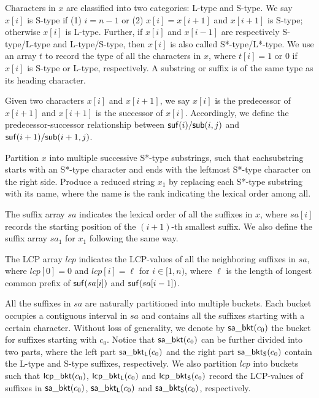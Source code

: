 \documentclass[10pt,journal,compsoc]{IEEEtran}
\begin{document}
Characters in $x$ are classified into two categories: L-type and S-type. We say $x[i]$ is S-type if (1) $i = n - 1$ or (2) $x[i] = x[i + 1]$ and $x[i + 1]$ is S-type; otherwise $x[i]$ is L-type. Further, if $x[i]$ and $x[i - 1]$ are respectively S-type/L-type and L-type/S-type, then $x[i]$ is also called S*-type/L*-type. We use an array $t$ to record the type of all the characters in $x$, where $t[i] = 1$ or $0$ if $x[i]$ is S-type or L-type, respectively. A substring or suffix is of the same type as its heading character.

Given two characters $x[i]$ and $x[i + 1]$, we say $x[i]$ is the predecessor of $x[i + 1]$ and $x[i + 1]$ is the successor of $x[i]$. Accordingly, we define the predecessor-successor relationship between ${\sf suf}(i)/{\sf sub}(i, j)$ and ${\sf suf}(i + 1)/{\sf sub}(i + 1, j)$.

Partition $x$ into multiple successive S*-type substrings, such that eachsubstring starts with an S*-type character and ends with the leftmost S*-type character on the right side. Produce a reduced string $x_1$ by replacing each S*-type substring with its name, where the name is the rank indicating the lexical order among all.

The suffix array $sa$ indicates the lexical order of all the suffixes in $x$, where $sa[i]$ records the starting position of the $(i + 1)$-th smallest suffix. We also define the suffix array $sa_1$ for $x_1$ following the same way.

The LCP array $lcp$ indicates the LCP-values of all the neighboring suffixes in $sa$, where $lcp[0] = 0$ and $lcp[i] = \ell$ for $i \in [1, n)$, where $\ell$ is the length of longest common prefix of ${\sf suf}(sa[i])$ and ${\sf suf}(sa[i - 1])$.

All the suffixes in $sa$ are naturally partitioned into multiple buckets. Each bucket occupies a contiguous interval in $sa$ and contains all the suffixes starting with a certain character. Without loss of generality, we denote by ${\sf sa\_bkt}(c_0)$ the bucket for suffixes starting with $c_0$. Notice that ${\sf sa\_bkt}(c_0)$ can be further divided into two parts, where the left part ${\sf sa\_bkt_L}(c_0)$ and the right part ${\sf sa\_bkt_S}(c_0)$ contain the L-type and S-type suffixes, respectively. We also partition $lcp$ into buckets such that ${\sf lcp\_bkt}(c_0)$, ${\sf lcp\_bkt_L}(c_0)$ and ${\sf lcp\_bkt_S}(c_0)$ record the LCP-values of suffixes in ${\sf sa\_bkt}(c_0)$, ${\sf sa\_bkt_L}(c_0)$ and ${\sf sa\_bkt_S}(c_0)$, respectively.
\end{document}
